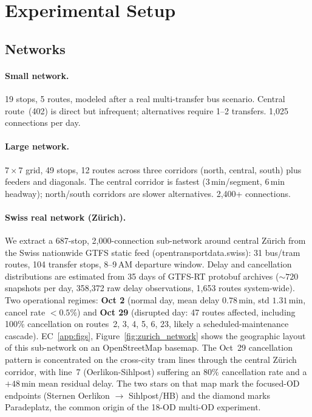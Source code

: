 \documentclass[11pt]{article}
\theoremstyle{definition}
\theoremstyle{remark}
\begin{document}
\section{Experimental Setup}
\label{sec:setup}

\subsection{Networks}

\paragraph{Small network.} 19 stops, 5 routes, modeled after a real multi-transfer bus scenario. Central route~(402) is direct but infrequent; alternatives require 1--2 transfers. 1,025 connections per day.

\paragraph{Large network.} $7{\times}7$ grid, 49 stops, 12 routes across three corridors (north, central, south) plus feeders and diagonals. The central corridor is fastest (3\,min/segment, 6\,min headway); north/south corridors are slower alternatives. 2,400+ connections.

\paragraph{Swiss real network (Zürich).} We extract a 687-stop,
2{,}000-connection sub-network around central Zürich from the Swiss
nationwide GTFS static feed (opentransportdata.swiss): 31 bus/tram
routes, 104 transfer stops, 8--9\,AM departure window. Delay and
cancellation distributions are estimated from 35 days of GTFS-RT
protobuf archives (${\sim}720$ snapshots per day, 358{,}372 raw delay
observations, 1{,}653 routes system-wide). Two operational regimes:
\textbf{Oct 2} (normal day, mean delay $0.78$\,min, std $1.31$\,min,
cancel rate $<0.5\%$) and \textbf{Oct 29} (disrupted day: 47 routes
affected, including 100\% cancellation on routes~2, 3, 4, 5, 6, 23,
likely a scheduled-maintenance cascade).
EC~\ref{app:figs}, Figure~\ref{fig:zurich_network} shows the geographic layout of this
sub-network on an OpenStreetMap basemap. The Oct~29 cancellation
pattern is concentrated on the cross-city tram lines through the
central Z\"urich corridor, with line~7 (Oerlikon-Sihlpost)
suffering an $80\%$ cancellation rate and a $+48$\,min
mean residual delay. The two stars on that map mark the focused-OD endpoints
(Sternen Oerlikon $\to$ Sihlpost/HB) and the diamond marks
Paradeplatz, the common origin of the 18-OD multi-OD experiment.
\end{document}
